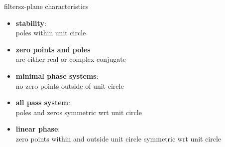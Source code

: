 		\begin{frame}{filters}{z-plane characteristics}
            \begin{itemize}
                \item   \textbf{stability}:\\ poles within unit circle
                \pause
                \item   \textbf{zero points and poles}\\ are either real or complex conjugate
                \pause
                \item   \textbf{minimal phase systems}:\\ no zero points outside of unit circle
                \pause
                \item   \textbf{all pass system}:\\ poles and zeros symmetric wrt unit circle
                \pause
                \item   \textbf{linear phase}:\\ zero points within and outside unit circle symmetric wrt unit circle
            \end{itemize}
 		\end{frame}
       
